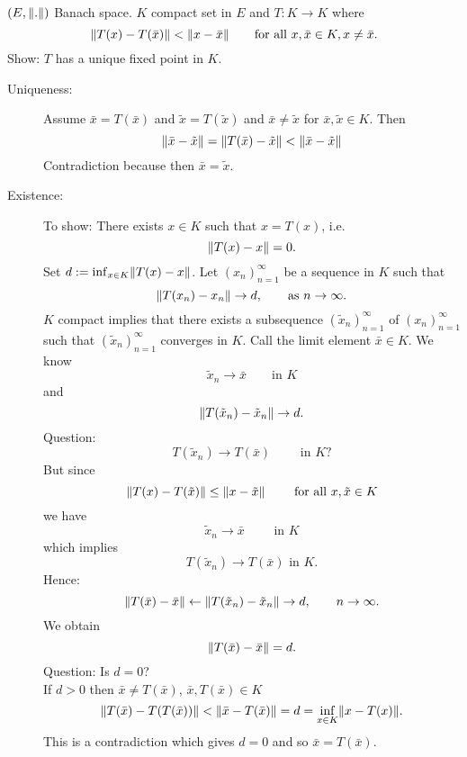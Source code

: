 \begin{beispiel}
	$(E,\norm{.})$ Banach space. $K$ compact set in $E$ and $T : K \to K$ where
	\[
		\norm{T(x)- T( \bar{x})} < \norm{x - \bar{x}} \qquad \text{for all }x, \bar{x} \in K, x \neq \bar{x}.
	\]
	Show: $T$ has a unique fixed point in $K$.
	\begin{description}
		\item[Uniqueness:] Assume $\bar{x} = T(\bar{x})$ and $\tilde x = T( \tilde x)$ and $\bar{x} \neq \tilde x$ for $ \bar{x}, \tilde x \in K$. Then
		\[
			\norm{\bar{x} - \tilde x} = \norm{ T( \bar{ x})- \tilde x} < \norm{ \bar{x}- \tilde x}
		\]
		Contradiction because then $\bar{x} = \tilde x$.
		\item[Existence:] To show: There exists $x \in K$ such that $x = T(x)$, i.e.
		\[
			\norm{T(x)- x} = 0.
		\]
		Set $d := \inf_{x \in K} \norm{T(x)-x}$. Let $(x_n)_{n=1}^{\infty}$ be a sequence in $K$ such that 
		\[
			\norm{T(x_n)-x_n} \to d, \qquad \text{as }n \to \infty.
		\]
		$K$ compact implies that there exists a subsequence $(\tilde x_n)_{n=1}^{\infty}$ of $(x_n)_{n=1}^{\infty}$ such that $(\tilde x_n)_{n=1}^{\infty}$ converges in $K$. Call the limit element $\bar{x} \in K$. We know
		\[
			\tilde x_n \to  \bar{x} \qquad \text{in }K
		\]
		and	 
		\[
			\norm{T( \tilde x_n)- \tilde x_n} \to d.
		\]
		Question: \[
			T(\tilde x_n) \to T(\bar{x}) \qquad \text{ in }K?
		\]
		But since
		\[
			\norm{T(x)- T( \tilde x)} \leq  \norm{x- \tilde x} \qquad \text{ for all }x, \tilde x \in K
		\]
		we have 
		\[
			\tilde x_n \to \bar{x} \qquad \text{ in }K
		\]
		which implies
		\[
			T( \tilde x_n) \to T( \bar{ x}) \text{ in }K.
		\]
		Hence: 
		\[
			\norm{T( \bar{ x})- \bar{x}} \leftarrow \norm{T(\tilde x_n)- \tilde x_n} \to d, \qquad  n \to  \infty.
		\]
		We obtain
		\[
			\norm{T(\bar{x})- \bar{x}} = d.
		\]
		Question: Is $d=0$? \\
		If $d>0$ then $\bar{x} \neq  T( \bar{x})$, $\bar{x}, T( \bar{x}) \in K$
		\[
			\norm{T(\bar{x})- T(T(\bar{x}))} < \norm{\bar{x}- T(\bar{x})} = d = \inf_{x \in K} \norm{x- T(x)}.
		\]
		This is a contradiction which gives $d=0$ and so $\bar{x} = T(\bar{x})$.
	\end{description}
\end{beispiel}
